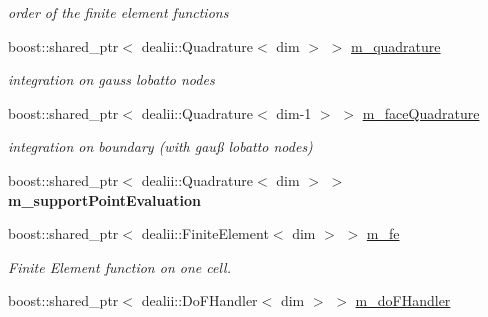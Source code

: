 \begin{DoxyCompactItemize}
\begin{DoxyCompactList}\small\item\em order of the finite element functions \item\end{DoxyCompactList}\item 
\hypertarget{classnatrium_1_1AdvectionOperator_a60997fa95371a281fcbfc9418d12d258}{
boost::shared\_\-ptr$<$ dealii::Quadrature$<$ dim $>$ $>$ \hyperlink{classnatrium_1_1AdvectionOperator_a60997fa95371a281fcbfc9418d12d258}{m\_\-quadrature}}
\label{classnatrium_1_1AdvectionOperator_a60997fa95371a281fcbfc9418d12d258}

\begin{DoxyCompactList}\small\item\em integration on gauss lobatto nodes \item\end{DoxyCompactList}\item 
\hypertarget{classnatrium_1_1AdvectionOperator_acf5c9e9e749cc771635a7dcefc9f569f}{
boost::shared\_\-ptr$<$ dealii::Quadrature$<$ dim-\/1 $>$ $>$ \hyperlink{classnatrium_1_1AdvectionOperator_acf5c9e9e749cc771635a7dcefc9f569f}{m\_\-faceQuadrature}}
\label{classnatrium_1_1AdvectionOperator_acf5c9e9e749cc771635a7dcefc9f569f}

\begin{DoxyCompactList}\small\item\em integration on boundary (with gauß lobatto nodes) \item\end{DoxyCompactList}\item 
\hypertarget{classnatrium_1_1AdvectionOperator_aed3833678ead684ce2d86383707962ab}{
boost::shared\_\-ptr$<$ dealii::Quadrature$<$ dim $>$ $>$ {\bfseries m\_\-supportPointEvaluation}}
\label{classnatrium_1_1AdvectionOperator_aed3833678ead684ce2d86383707962ab}

\item 
\hypertarget{classnatrium_1_1AdvectionOperator_ab2df69e4fdda8a3243a722564279ef83}{
boost::shared\_\-ptr$<$ dealii::FiniteElement$<$ dim $>$ $>$ \hyperlink{classnatrium_1_1AdvectionOperator_ab2df69e4fdda8a3243a722564279ef83}{m\_\-fe}}
\label{classnatrium_1_1AdvectionOperator_ab2df69e4fdda8a3243a722564279ef83}

\begin{DoxyCompactList}\small\item\em Finite Element function on one cell. \item\end{DoxyCompactList}\item 
\hypertarget{classnatrium_1_1AdvectionOperator_aa3139b789e3cf4db3a367b756df88440}{
boost::shared\_\-ptr$<$ dealii::DoFHandler$<$ dim $>$ $>$ \hyperlink{classnatrium_1_1AdvectionOperator_aa3139b789e3cf4db3a367b756df88440}{m\_\-doFHandler}}
\label{classnatrium_1_1AdvectionOperator_aa3139b789e3cf4db3a367b756df88440}


\end{DoxyCompactItemize}
